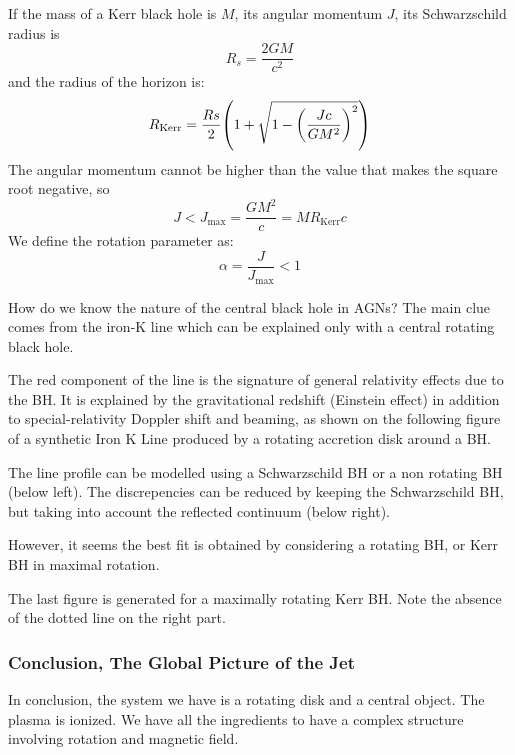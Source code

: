 \documentclass[10pt,a4paper,english,draft]{article}
\let\originalleft\left
\let\originalright\right
\renewcommand{\left}{\mathopen{}\mathclose\bgroup\originalleft}
\renewcommand{\right}{\aftergroup\egroup\originalright}
\begin{document}
If the mass of a Kerr black hole is $M$, its angular momentum $J$, its Schwarzschild radius is
\begin{equation}
  R_s = \frac{2GM}{c^2}
\end{equation}
and the radius of the horizon is:
\begin{equation}
  R_\mathrm{Kerr} = \frac{Rs}{2} \left( 1 + \sqrt{1-\left( \frac{Jc}{GM^2} \right)^2 } \right)
\end{equation}
The angular momentum cannot be higher than the value that makes the square root negative, so
\begin{equation}
  J < J_\mathrm{max} = \frac{GM^2}{c} = MR_\mathrm{Kerr}c
\end{equation}
We define the rotation parameter as:
\begin{equation}
  \alpha = \frac{J}{J_\mathrm{max}} < 1
\end{equation}

How do we know the nature of the central black hole in AGNs? The main clue comes from the iron-K line which can be explained only with a central rotating black hole.


The red component of the line is the signature of general relativity effects due to the BH. It is explained by the gravitational redshift (Einstein effect) in addition to special-relativity Doppler shift and beaming, as shown on the following figure of a synthetic Iron K Line produced by a rotating accretion disk around a BH.


The line profile can be modelled using a Schwarzschild BH or a non rotating BH (below left). The discrepencies can be reduced by keeping the Schwarzschild BH, but taking into account the reflected continuum (below right).


However, it seems the best fit is obtained by considering a rotating BH, or Kerr BH in maximal rotation.

The last figure is generated for a maximally rotating Kerr BH. Note the absence of the dotted line on the right part.
\subsubsection{Conclusion, The Global Picture of the Jet}

In conclusion, the system we have is a rotating disk and a central
object. The plasma is ionized. We have all the ingredients to have a complex
structure involving rotation and magnetic field.
\end{document}
